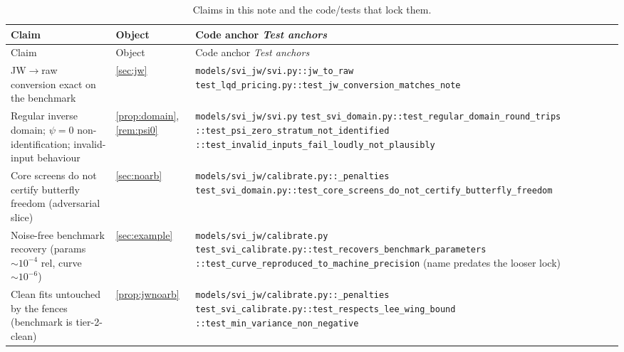 \documentclass[11pt]{article}
\begin{document}
\begingroup
\small
\setlength{\tabcolsep}{4pt}
\renewcommand{\arraystretch}{1.15}
\begin{longtable}{@{}p{}p{}p{}@{}}
\caption{Claims in this note and the code/tests that lock them.}\\
\toprule Claim & Object & Code anchor \newline \emph{Test anchors}\\ \midrule
\endfirsthead
\toprule Claim & Object & Code anchor \newline \emph{Test anchors}\\ \midrule
\endhead
JW$\to$raw conversion exact on the benchmark &
\cref{sec:jw} &
\nolinkurl{models/svi_jw/svi.py::jw_to_raw}\newline
\nolinkurl{test_lqd_pricing.py::test_jw_conversion_matches_note}\\
\addlinespace
Regular inverse domain; $\psi=0$ non-identification; invalid-input
behaviour &
\cref{prop:domain}, \cref{rem:psi0} &
\nolinkurl{models/svi_jw/svi.py}\newline
\nolinkurl{test_svi_domain.py::test_regular_domain_round_trips}\newline
\nolinkurl{::test_psi_zero_stratum_not_identified}\newline
\nolinkurl{::test_invalid_inputs_fail_loudly_not_plausibly}\\
\addlinespace
Core screens do not certify butterfly freedom (adversarial slice) &
\cref{sec:noarb} &
\nolinkurl{models/svi_jw/calibrate.py::_penalties}\newline
\nolinkurl{test_svi_domain.py::test_core_screens_do_not_certify_butterfly_freedom}\\
\addlinespace
Noise-free benchmark recovery (params $\sim10^{-4}$ rel, curve
$\sim10^{-6}$) &
\cref{sec:example} &
\nolinkurl{models/svi_jw/calibrate.py}\newline
\nolinkurl{test_svi_calibrate.py::test_recovers_benchmark_parameters}\newline
\nolinkurl{::test_curve_reproduced_to_machine_precision} (name predates the
looser lock)\\
\addlinespace
Clean fits untouched by the fences (benchmark is tier-2-clean) &
\cref{prop:jwnoarb} &
\nolinkurl{models/svi_jw/calibrate.py::_penalties}\newline
\nolinkurl{test_svi_calibrate.py::test_respects_lee_wing_bound}\newline
\nolinkurl{::test_min_variance_non_negative}\\

\end{longtable}
\end{document}
